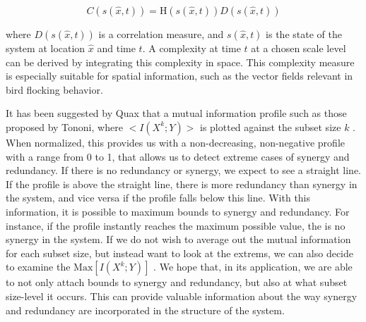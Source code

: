 \documentclass[../main.tex]{subfiles}
\begin{document}
\begin{equation}
C(s(\hat{x},t)) = \mathrm{H}(s(\hat{x},t)) D(s(\hat{x},t))
\end{equation}

where $D(s(\hat{x},t))$ is a correlation measure, and $s(\hat{x},t)$ is the state of the system at location $\hat{x}$ and time $t$.
A complexity at time $t$ at a chosen scale level can be derived by integrating this complexity in space.
This complexity measure is especially suitable for spatial information, such as the vector fields relevant in bird flocking behavior.

It has been suggested by Quax that a mutual information profile such as those proposed by Tononi, where $< I(X^k;Y) >$ is plotted against the subset size $k$ \cite{QuaxPersonal,tononi1999measures}. 
When normalized, this provides us with a non-decreasing, non-negative profile with a range from 0 to 1, that allows us to detect extreme cases of synergy and redundancy.
If there is no redundancy or synergy, we expect to see a straight line.
If the profile is above the straight line, there is more redundancy than synergy in the system, and vice versa if the profile falls below this line.
With this information, it is possible to maximum bounds to synergy and redundancy.
For instance, if the profile instantly reaches the maximum possible value, the is no synergy in the system.
If we do not wish to average out the mutual information for each subset size, but instead want to look at the extrems, we can also decide to examine the $\mathrm{Max} [ I(X^k;Y) ]$ .
We hope that, in its application, we are able to not only attach bounds to synergy and redundancy, but also at what subset size-level it occurs.
This can provide valuable information about the way synergy and redundancy are incorporated in the structure of the system.


\end{document}
